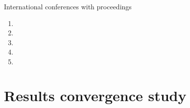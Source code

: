 \documentclass[aspectratio=169]{ISAE-Beamer}
\begin{document}
\begin{frame}{International conferences with proceedings}
\begin{enumerate}
\item {} 
\vspace{.1cm}
\item {} 
\vspace{.1cm}
\item {} 
\vspace{.1cm}
\item {} 
\vspace{.1cm}
\item {}
\end{enumerate}
\end{frame}

\appendix

\begin{frame}
\end{frame}

\begin{frame}
\end{frame}

\section{Results convergence study}
\end{document}
